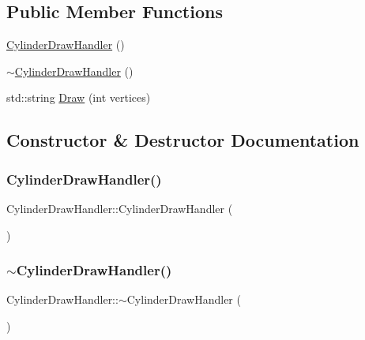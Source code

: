 \subsection*{Public Member Functions}
\begin{DoxyCompactItemize}
\item 
\mbox{\hyperlink{class_cylinder_draw_handler_a533f4b8c4987561d1864c90a8cbe5399}{Cylinder\+Draw\+Handler}} ()
\item 
\mbox{\hyperlink{class_cylinder_draw_handler_ab04f75cb9c98773c8d064449e82d819e}{$\sim$\+Cylinder\+Draw\+Handler}} ()
\item 
std\+::string \mbox{\hyperlink{class_cylinder_draw_handler_ac2ca330f3084182da1bd3db358bb996d}{Draw}} (int vertices)
\end{DoxyCompactItemize}


\subsection{Constructor \& Destructor Documentation}
\mbox{\label{class_cylinder_draw_handler_a533f4b8c4987561d1864c90a8cbe5399}} 
\subsubsection{\texorpdfstring{CylinderDrawHandler()}{CylinderDrawHandler()}}
{\footnotesize\ttfamily Cylinder\+Draw\+Handler\+::\+Cylinder\+Draw\+Handler (\begin{DoxyParamCaption}{ }\end{DoxyParamCaption})}

\mbox{\label{class_cylinder_draw_handler_ab04f75cb9c98773c8d064449e82d819e}} 
\subsubsection{\texorpdfstring{$\sim$CylinderDrawHandler()}{~CylinderDrawHandler()}}
{\footnotesize\ttfamily Cylinder\+Draw\+Handler\+::$\sim$\+Cylinder\+Draw\+Handler (\begin{DoxyParamCaption}{ }\end{DoxyParamCaption})}



